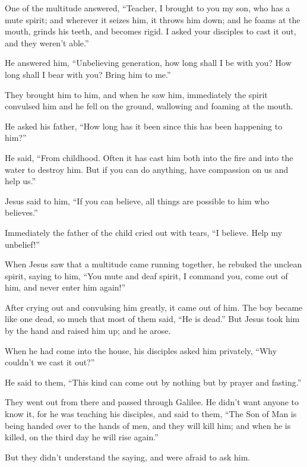  One of the multitude answered, ``Teacher, I brought to
you my son, who has a mute spirit;  and wherever it
seizes him, it throws him down; and he foams at the mouth, grinds his
teeth, and becomes rigid. I asked your disciples to cast it out, and
they weren't able.''

 He answered him, ``Unbelieving generation, how long
shall I be with you? How long shall I bear with you? Bring him to me.''

 They brought him to him, and when he saw him,
immediately the spirit convulsed him and he fell on the ground,
wallowing and foaming at the mouth.

 He asked his father, ``How long has it been since this
has been happening to him?''

He said, ``From childhood.  Often it has cast him both
into the fire and into the water to destroy him. But if you can do
anything, have compassion on us and help us.''

 Jesus said to him, ``If you can believe, all things are
possible to him who believes.''

 Immediately the father of the child cried out with
tears, ``I believe. Help my unbelief!''

 When Jesus saw that a multitude came running together,
he rebuked the unclean spirit, saying to him, ``You mute and deaf
spirit, I command you, come out of him, and never enter him again!''

 After crying out and convulsing him greatly, it came out
of him. The boy became like one dead, so much that most of them said,
``He is dead.''  But Jesus took him by the hand and
raised him up; and he arose.

 When he had come into the house, his disciples asked him
privately, ``Why couldn't we cast it out?''

 He said to them, ``This kind can come out by nothing but
by prayer and fasting.''

 They went out from there and passed through Galilee. He
didn't want anyone to know it,  for he was teaching his
disciples, and said to them, ``The Son of Man is being handed over to
the hands of men, and they will kill him; and when he is killed, on the
third day he will rise again.''

 But they didn't understand the saying, and were afraid
to ask him.

